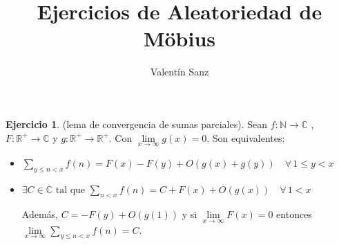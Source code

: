 \documentclass[12pt, a4paper]{article}
\title{Ejercicios de Aleatoriedad de Möbius}
\author{Valentín Sanz}
\date{}
\newcommand{\naturales}{\mathbb{N}}
\newcommand{\reales}{\mathbb{R}}
\newcommand{\complejos}{\mathbb{C}}
\theoremstyle{plain}
\theoremstyle{definition}
\newtheorem*{exercise}{Ejercicio}
\theoremstyle{remark}
\begin{document}
\maketitle

\newpage

\begin{exercise}

 (lema de convergencia de sumas parciales). Sean $f: \naturales \to \complejos$ , $F: \reales ^+
 \to \complejos$ y $g: \reales ^+ \to \reales^+$. Con $\lim\limits_{x \to \infty} g(x) = 0$. Son equivalentes:
 \begin{itemize}
\item[1)]
\(
\sum_{y \leq n<x}^{} f(n) = F(x) - F(y) + O(g(x) + g(y)) \quad \forall \, 1\leq y<x 
\)
\item[2)]
\(
\exists C \in \complejos  \text{ tal que } \sum_{n<x} f(n) = C + F(x) + O(g(x)) \quad \forall \, 1<x
\)

Además, $C = -F(y) + O(g(1))$ y si $\lim\limits_{x \to \infty}F(x) = 0$ entonces
 $\lim\limits_{x \to \infty}\sum_{y \leq n<x}^{} f(n) = C$.
 \end{itemize}
\end{exercise}
\end{document}
